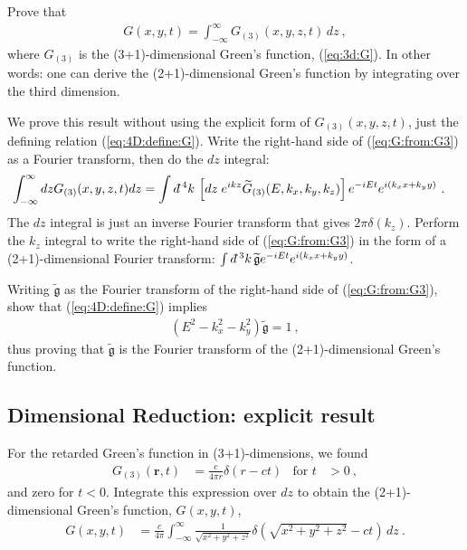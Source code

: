 \documentclass[12pt]{article}
\numberwithin{equation}{section}    %
\renewcommand{\tilde}{\widetilde}   %
\renewcommand{\vec}[1]{\mathbf{#1}} %
\newcommand{\dbar}{d\mkern-6mu\mathchar'26}    %
\begin{document}
Prove that 
\begin{align}
	G(x,y,t) = \int_{-\infty}^\infty G_{(3)}(x,y,z,t) \, dz \ ,
	\label{eq:G:from:G3}
\end{align}
where $G_{(3)}$ is the (3+1)-dimensional Green's function, (\ref{eq:3d:G}). In other words: one can derive the (2+1)-dimensional Green's function by integrating over the third dimension.

We prove this result without using the explicit form of $G_{(3)}(x,y,z,t)$, just the defining relation (\ref{eq:4D:define:G}). Write the right-hand side of (\ref{eq:G:from:G3}) as a Fourier transform, then do the $dz$ integral:
\begin{align}
	\int_{-\infty}^\infty dz G_{(3)}(x,y,z,t)dz
	&=
	\int \dbar^4k \,
	\left[dz\; e^{ikz} \tilde G_{(3)}(E,k_x, k_y, k_z)\right]
	 e^{-iEt} e^{i(k_xx + k_y y)} \ .
\end{align}
The $dz$ integral is just an inverse Fourier transform that gives $2\pi\delta(k_z)$. Perform the $k_z$ integral to write the right-hand side of (\ref{eq:G:from:G3}) in the form of a (2+1)-dimensional Fourier transform: $\int \dbar^3 k \, \tilde{\mathfrak{g}}e^{-iEt}e^{i(k_xx+k_yy)}$. 

Writing $\tilde{\mathfrak{g}}$ as the Fourier transform of the right-hand side of (\ref{eq:G:from:G3}), show that (\ref{eq:4D:define:G}) implies
\begin{align}
	\left(E^2 - k_x^2 - k_y^2\right) \tilde{\mathfrak{g}} = 1\ ,
\end{align}
thus proving that $\tilde{\mathfrak{g}}$ is the Fourier transform of the (2+1)-dimensional Green's function.

\subsection{Dimensional Reduction: explicit result}

For the retarded Green's function in (3+1)-dimensions, we found
\begin{align}
	G_{(3)}(\vec r,t) &= \frac{c}{4\pi r} \delta(r-ct)
	&
	\text{for } t&>0 \ ,
\end{align}
and zero for $t<0$. Integrate this expression over $dz$ to obtain the (2+1)-dimensional Green's function, $G(x,y,t)$,
\begin{align}
	G(x,y,t) &= \frac{c}{4\pi} \int_{-\infty}^\infty 
	\frac{1}{\sqrt{x^2+y^2 + z^2}} \delta\left(\sqrt{x^2+y^2 + z^2} - ct\right) \, dz \ .
\end{align}
\end{document}
